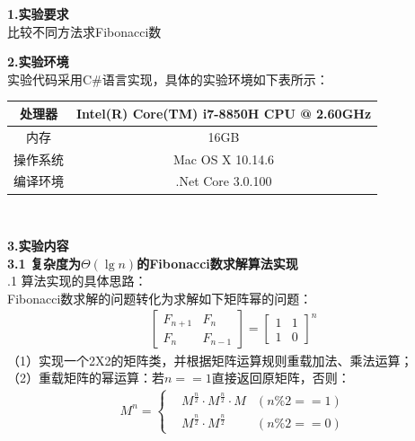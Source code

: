 \documentclass[a4paper]{article}
\begin{document}
\courseheader
{}

\info

\begin{enumerate}
  \setlength{\itemsep}{3\parskip}
  \textbf{1.实验要求}\\
  比较不同方法求Fibonacci数\\
  \bigskip

  \textbf{2.实验环境}\\
  实验代码采用C\#语言实现，具体的实验环境如下表所示：\\ \medskip
  \begin{tabular}{c|c}
    \hline\hline
    处理器 & Intel(R) Core(TM) i7-8850H CPU @ 2.60GHz \\ \hline
    内存 & 16GB\\ \hline
    操作系统& Mac OS X 10.14.6\\ \hline
    编译环境& .Net Core 3.0.100\\
    \hline\hline
  \end{tabular}\\
  \bigskip

  \textbf{3.实验内容}\\
  \textbf{3.1 复杂度为$\Theta(\lg n)$的Fibonacci数求解算法实现}\\
  .1 算法实现的具体思路：\\
  Fibonacci数求解的问题转化为求解如下矩阵幂的问题：
  \begin{align*}
    \begin{bmatrix} 
      F_{n+1} & F_n \\
      F_n & F_{n-1}
    \end{bmatrix}
    ={
    \begin{bmatrix} 
      1 & 1 \\
      1 & 0
    \end{bmatrix}
    }^n
  \end{align*}
  （1）实现一个2X2的矩阵类，并根据矩阵运算规则重载加法、乘法运算；\\
  （2）重载矩阵的幂运算：若$n==1$直接返回原矩阵，否则：
  \begin{align*}
    M^n=\left\{
    \begin{aligned}
      &M^{\frac{n}{2}} \cdot M^{\frac{n}{2}} \cdot M &(n \%2 == 1)\\
      &M^{\frac{n}{2}} \cdot M^{\frac{n}{2}} &(n \%2 == 0)
    \end{aligned}
    \right.
  \end{align*}


\end{enumerate}
\end{document}

